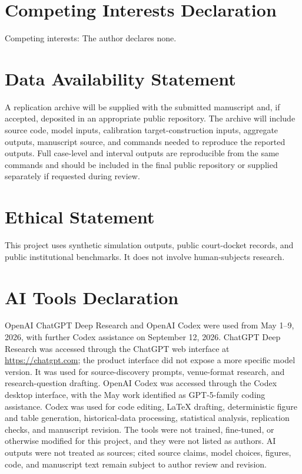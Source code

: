 \documentclass[
  journal=small,
  manuscript=research-article,
  year=2026
]{cup-journal}
\begin{document}
\section*{Competing Interests Declaration}
Competing interests: The author declares none.

\section*{Data Availability Statement}
A replication archive will be supplied with the submitted manuscript and, if accepted, deposited in an appropriate public repository. The archive will include source code, model inputs, calibration target-construction inputs, aggregate outputs, manuscript source, and commands needed to reproduce the reported outputs. Full case-level and interval outputs are reproducible from the same commands and should be included in the final public repository or supplied separately if requested during review.

\section*{Ethical Statement}
This project uses synthetic simulation outputs, public court-docket records, and public institutional benchmarks. It does not involve human-subjects research.

\section*{AI Tools Declaration}
OpenAI ChatGPT Deep Research and OpenAI Codex were used from May 1--9, 2026, with further Codex assistance on September 12, 2026. ChatGPT Deep Research was accessed through the ChatGPT web interface at \url{https://chatgpt.com}; the product interface did not expose a more specific model version. It was used for source-discovery prompts, venue-format research, and research-question drafting. OpenAI Codex was accessed through the Codex desktop interface, with the May work identified as GPT-5-family coding assistance. Codex was used for code editing, LaTeX drafting, deterministic figure and table generation, historical-data processing, statistical analysis, replication checks, and manuscript revision. The tools were not trained, fine-tuned, or otherwise modified for this project, and they were not listed as authors. AI outputs were not treated as sources; cited source claims, model choices, figures, code, and manuscript text remain subject to author review and revision.

\begin{thebibliography}{}

\end{thebibliography}
\end{document}
